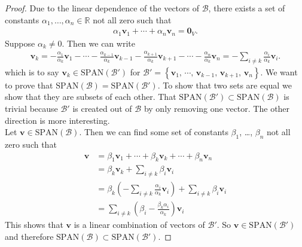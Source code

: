 
\begin{proof}
Due to the linear dependence of the vectors of $\mathcal{B}$, there exists a set of constants $\alpha_1,\dots,\alpha_n \in \mathbb{R}$ not all zero such that
\begin{align*}
\alpha_1 \mathbf{v}_1 + \cdots + \alpha_n \mathbf{v}_n =  \mathbf{0}_V.
\end{align*}
Suppose $\alpha_k \neq 0$. Then we can write
\begin{align*}
\mathbf{v}_k = -\frac{\alpha_1}{\alpha_k} \mathbf{v}_1 - \cdots -\frac{\alpha_{k-1}}{\alpha_k} \mathbf{v}_{k-1} -\frac{\alpha_{k+1}}{\alpha_k}\mathbf{v}_{k+1} - \cdots -\frac{\alpha_n}{\alpha_k}  \mathbf{v}_n = -\sum_{i \neq k} \frac{\alpha_i}{\alpha_k} \mathbf{v}_i.
\end{align*}
which is to say $\mathbf{v}_k \in \text{SPAN}(\mathcal{B}')$ for $\mathcal{B}' = \left\{ \mathbf{v}_1, \, \cdots, \, \mathbf{v}_{k-1}, \,\mathbf{v}_{k+1}, \,  \mathbf{v}_n \right\}$. We want to prove that $\text{SPAN}(\mathcal{B}) = \text{SPAN}(\mathcal{B}')$. To show that two sets are equal we show that they are subsets of each other. That $ \text{SPAN}(\mathcal{B'}) \subset  \text{SPAN}(\mathcal{B})$ is trivial because $\mathcal{B}'$ is created out of $\mathcal{B}$ by only removing one vector. The other direction is more interesting. \\

\noindent Let $\mathbf{v} \in \text{SPAN}(\mathcal{B})$. Then we can find some set of constants $\beta_1$, \dots, $\beta_n$ not all zero such that
\begin{align*}
\mathbf{v} &= \beta_1 \mathbf{v}_1 + \cdots + \beta_k \mathbf{v}_k + \cdots + \beta_n \mathbf{v}_n \\
&= \beta_k \mathbf{v}_k + \sum_{i \neq k} \beta_i \mathbf{v}_i \\
&= \beta_k \left(-\sum_{i \neq k} \frac{\alpha_i}{\alpha_k} \mathbf{v}_i \right) + \sum_{i \neq k} \beta_i \mathbf{v}_i \\
&= \sum_{i \neq k} \left(\beta_i - \frac{\beta_k \alpha_i}{\alpha_k} \right)\mathbf{v}_i 
\end{align*}
This shows that $\mathbf{v}$ is a linear combination of vectors of $\mathcal{B}'$. So $\mathbf{v} \in \text{SPAN}(\mathcal{B}')$ and therefore $\text{SPAN}(\mathcal{B}) \subset  \text{SPAN}(\mathcal{B'})$.
\end{proof}



